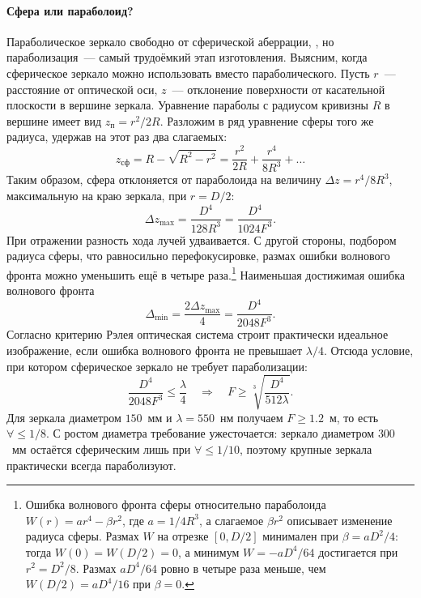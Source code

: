 \paragraph{Сфера или параболоид?} Параболическое зеркало свободно от сферической аберрации, , но параболизация~--- самый трудоёмкий этап изготовления. Выясним, когда сферическое зеркало можно использовать вместо параболического. Пусть $r$~--- расстояние от оптической оси, $z$~--- отклонение поверхности от касательной плоскости в вершине зеркала. Уравнение параболы с радиусом кривизны $R$ в вершине имеет вид $z_\text{п} = r^2/2R$. Разложим в ряд уравнение сферы того же радиуса, удержав на этот раз два слагаемых:
\begin{equation*}
    z_\text{сф} = R - \sqrt{R^2 - r^2}
        = \frac{r^2}{2R} + \frac{r^4}{8R^3} + \dots
\end{equation*}
Таким образом, сфера отклоняется от параболоида на величину $\Delta z = r^4/8R^3$, максимальную на краю зеркала, при $r = D/2$:
\begin{equation*}
    \Delta z_\text{max} = \frac{D^4}{128 R^3} = \frac{D^4}{1024 F^3}.
\end{equation*}
При отражении разность хода лучей удваивается. С другой стороны, подбором радиуса сферы, что равносильно перефокусировке, размах ошибки волнового фронта можно уменьшить ещё в четыре раза.\footnote{Ошибка волнового фронта сферы относительно параболоида $W(r) = a r^4 - \beta r^2$, где $a = 1/4R^3$, а слагаемое $\beta r^2$ описывает изменение радиуса сферы. Размах $W$ на отрезке $[0, D/2]$ минимален при $\beta = a D^2/4$: тогда $W(0) = W(D/2) = 0$, а минимум $W = -a D^4/64$ достигается при $r^2 = D^2/8$. Размах $a D^4/64$ ровно в четыре раза меньше, чем $W(D/2) = a D^4/16$ при $\beta = 0$.} Наименьшая достижимая ошибка волнового фронта
\begin{equation}
    \Delta_\text{min} = \frac{2 \Delta z_\text{max}}{4} = \frac{D^4}{2048 F^3}.
\end{equation}
Согласно критерию Рэлея оптическая система строит практически идеальное изображение, если ошибка волнового фронта не превышает $\lambda/4$. Отсюда условие, при котором сферическое зеркало не требует параболизации:
\begin{equation}
    \frac{D^4}{2048 F^3} \leqslant \frac{\lambda}{4}
    \quad \Longrightarrow \quad
    F \geqslant \sqrt[3]{\frac{D^4}{512 \lambda}}.
    \label{eq:sphere-vs-paraboloid}
\end{equation}
Для зеркала диаметром $150$~мм и $\lambda = 550$~нм получаем $F \geqslant 1.2$~м, то есть $\forall \leqslant 1/8$. С ростом диаметра требование ужесточается: зеркало диаметром $300$~мм остаётся сферическим лишь при $\forall \leqslant 1/10$, поэтому крупные зеркала практически всегда параболизуют.
